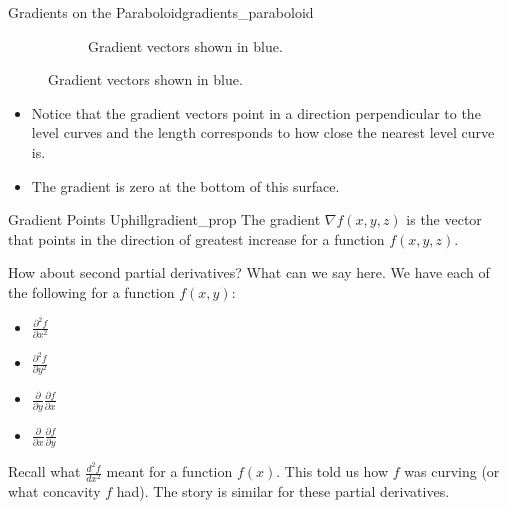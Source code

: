\begin{ex}{Gradients on the Paraboloid}{gradients_paraboloid}
\begin{figure}[H]
\begin{subfigure}[h]{.45\textwidth}
                            \caption{Gradient vectors shown in blue.}
                            \end{subfigure}
                        \end{figure}
                        \begin{itemize}
                            \item Notice that the gradient vectors point in a direction perpendicular to the level curves and the length corresponds to how close the nearest level curve is.
                            \item The gradient is zero at the bottom of this surface.  
                        \end{itemize}
                        \end{ex}
                        
                        \begin{prop}{Gradient Points Uphill}{gradient_prop}
                        The gradient $\nabla f(x,y,z)$ is the vector that points in the direction of greatest increase for a function $f(x,y,z)$.
                        \end{prop}
                        
                        How about second partial derivatives? What can we say here. We have each of the following for a function $f(x,y)$:
                        \begin{itemize}
                            \item $\frac{\partial^2 f}{\partial x^2}$
                            \item $\frac{\partial^2 f}{\partial y^2}$
                            \item $\frac{\partial}{\partial y}\frac{\partial f}{\partial x}$
                            \item $\frac{\partial}{\partial x}\frac{\partial f}{\partial y}$
                        \end{itemize}
                        
                        Recall what $\frac{d^2 f}{dx^2}$ meant for a function $f(x)$.  This told us how $f$ was curving (or what concavity $f$ had). The story is similar for these partial derivatives.
                        
